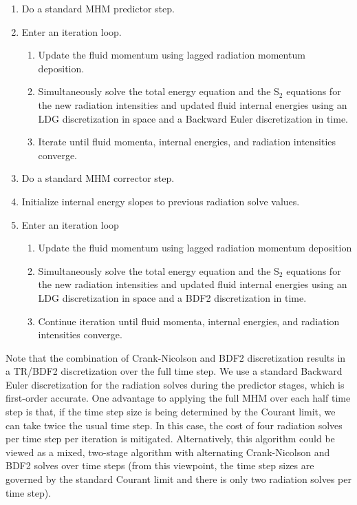 \documentclass[preprint,12pt]{elsarticle}
\begin{document}
\begin{enumerate}
  \item Do a standard MHM predictor step. 
  \item Enter an iteration loop.
  \begin{enumerate}
    \item Update the fluid momentum using lagged radiation momentum deposition.
    \item Simultaneously solve the total energy equation and the S$_2$ equations for the new radiation 
        intensities and updated fluid internal energies using an LDG discretization 
    in space and a Backward Euler discretization in time.
    \item Iterate until fluid momenta, internal energies, and radiation intensities converge.
  \end{enumerate}
  \item Do a standard MHM corrector step.
  \item Initialize internal energy slopes to previous radiation solve values.
  \item Enter an iteration loop
  \begin{enumerate}
  \item Update the fluid momentum using lagged radiation momentum deposition
  \item Simultaneously solve the total energy equation and the S$_2$ equations for the new radiation intensities and updated fluid internal energies 
	using an LDG discretization in space and a BDF2 discretization in time.
  \item Continue iteration until fluid momenta, internal energies, and radiation intensities converge.
  \end{enumerate}
\end{enumerate}
Note that the combination of Crank-Nicolson and BDF2 discretization results in a TR/BDF2
discretization over the full time step.  We use a standard Backward Euler discretization
for the radiation solves during the predictor stages, which is first-order accurate.  One
advantage to applying the full MHM over each half time step is that, if the time step size is being determined by the Courant limit, we can
take twice the usual time step.  In this
case, the cost of four radiation solves per time step per iteration is mitigated.  Alternatively, this algorithm could be viewed as a mixed,
two-stage algorithm with alternating Crank-Nicolson and BDF2 solves over time steps (from this viewpoint, the time step sizes are governed
by the standard Courant limit and there is only two radiation solves per time step).  
\end{document}

